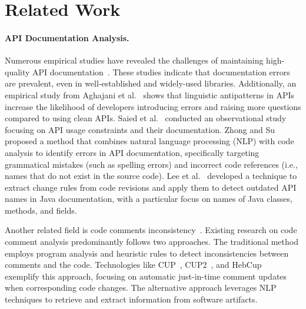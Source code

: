 \section{Related Work}\label{sec:related-mpchecker}

\paragraph{API Documentation Analysis.}
Numerous empirical studies have revealed the challenges of maintaining high-quality API
documentation~\cite{aghajani2018large,arnaoudova2016linguistic, dagenais2010creating,
aghajani2020software, head2018not, liu2020generating, monperrus2012should, saied2015observational,
shi2011empirical, uddin2015api, zhong2020empirical, kang2021active}. These studies indicate that
documentation errors are prevalent, even in well-established and widely-used libraries.
Additionally, an empirical study from Aghajani et al.~\cite{aghajani2018large} shows that linguistic antipatterns in APIs
increase the likelihood of developers introducing errors and raising more questions compared to
using clean APIs. Saied et al.~\cite{saied2015observational} conducted an observational study focusing on API usage constraints
and their documentation. Zhong and Su~\cite{zhong2013detecting} proposed a method that combines natural language processing
(NLP) with code analysis to identify errors in API documentation, specifically targeting
grammatical mistakes (such as spelling errors) and incorrect code references (i.e., names that do
not exist in the source code). Lee et al.~\cite{lee2019automatic} developed a technique to extract change rules from code
revisions and apply them to detect outdated API names in Java documentation, with a particular
focus on names of Java classes, methods, and fields.

Another related field is code comments inconsistency~\cite{blasi2018replicomment, habib2018class, liu2014automatic, nie2019framework, panthaplackel2021deep, steidl2013quality, zhai2020cpc, wen2019large}. Existing research on code comment analysis predominantly follows two approaches. The traditional method employs program analysis and heuristic rules to detect inconsistencies between comments and the code. Technologies like CUP~\cite{liu2020automating}, CUP2~\cite{liu2021just}, and HebCup~\cite{lin2021automated} exemplify this approach, focusing on automatic just-in-time comment updates when corresponding code changes. The alternative approach leverages NLP techniques to retrieve and extract information from software artifacts.

